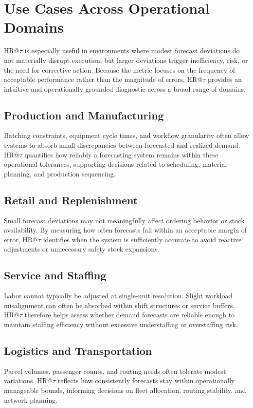 \section{Use Cases Across Operational Domains}

HR@\(\tau\) is especially useful in environments where modest forecast deviations
do not materially disrupt execution, but larger deviations trigger inefficiency,
risk, or the need for corrective action. Because the metric focuses on the
frequency of acceptable performance rather than the magnitude of errors,
HR@\(\tau\) provides an intuitive and operationally grounded diagnostic across a
broad range of domains.

\subsection{Production and Manufacturing}
Batching constraints, equipment cycle times, and workflow granularity often allow
systems to absorb small discrepancies between forecasted and realized demand.
HR@\(\tau\) quantifies how reliably a forecasting system remains within these
operational tolerances, supporting decisions related to scheduling, material
planning, and production sequencing.

\subsection{Retail and Replenishment}
Small forecast deviations may not meaningfully affect ordering behavior or stock
availability. By measuring how often forecasts fall within an acceptable margin of
error, HR@\(\tau\) identifies when the system is sufficiently accurate to avoid
reactive adjustments or unnecessary safety stock expansions.

\subsection{Service and Staffing}
Labor cannot typically be adjusted at single-unit resolution. Slight workload
misalignment can often be absorbed within shift structures or service buffers.
HR@\(\tau\) therefore helps assess whether demand forecasts are reliable enough to
maintain staffing efficiency without excessive understaffing or overstaffing risk.

\subsection{Logistics and Transportation}
Parcel volumes, passenger counts, and routing needs often tolerate modest
variations. HR@\(\tau\) reflects how consistently forecasts stay within
operationally manageable bounds, informing decisions on fleet allocation, routing
stability, and network planning.

